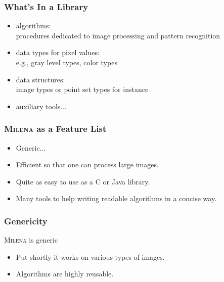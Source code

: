 \documentclass{beamer}
\newcommand{\mln}{\textsc{Milena}\xspace}
\begin{document}
\begin{frame}%
  \frametitle{What's In a Library}

  \begin{itemize}
  \item algorithms:\\
    procedures dedicated to image processing and pattern recognition
    \smallskip
  \item data types for pixel values:\\
    e.g., gray level types, color types
    \smallskip
  \item data structures:\\
    image types or point set types for instance
    \smallskip
  \item auxiliary tools...
  \end{itemize}

\end{frame}


\begin{frame}
  \frametitle{\mln as a Feature List}

  \begin{itemize}
  \item Generic...
  \item Efficient so that one can process large images.
  \item Quite as easy to use as a C or Java library.
  \item Many tools to help writing readable algorithms in a concise way.
  \end{itemize}

\end{frame}


\begin{frame}
  \frametitle{Genericity}

  \begin{block}{\mln is generic}
    \begin{itemize}
    \item Put shortly it works on various types of images.
    \item Algorithms are highly reusable.
    \end{itemize}
  \end{block}


\end{frame}
\end{document}

